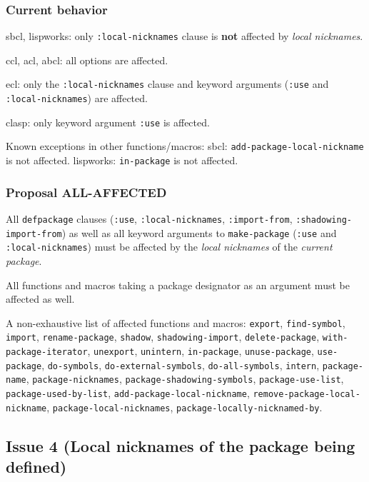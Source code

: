 \documentclass[11pt]{article}
\begin{document}
\subsubsection{Current behavior}
\label{sec:org2baa90e}
sbcl, lispworks:
  only \texttt{:local-nicknames} clause is \textbf{not} affected by \emph{local nicknames}.

ccl, acl, abcl:
  all options are affected.

ecl:
  only the \texttt{:local-nicknames} clause and keyword arguments (\texttt{:use} and
  \texttt{:local-nicknames}) are affected.

clasp:
  only keyword argument \texttt{:use} is affected.

Known exceptions in other functions/macros:
sbcl: \texttt{add-package-local-nickname} is not affected.
lispworks: \texttt{in-package} is not affected.
\subsubsection{Proposal ALL-AFFECTED}
\label{sec:orgcf9a10d}
All \texttt{defpackage} clauses (\texttt{:use}, \texttt{:local-nicknames}, \texttt{:import-from},
\texttt{:shadowing-import-from}) as well as all keyword arguments to \texttt{make-package}
(\texttt{:use} and \texttt{:local-nicknames}) must be affected by the \emph{local nicknames} of the
\emph{current package}.

All functions and macros taking a package designator as an argument must be
affected as well.

A non-exhaustive list of affected functions and macros:
  \texttt{export}, \texttt{find-symbol}, \texttt{import}, \texttt{rename-package}, \texttt{shadow},
  \texttt{shadowing-import}, \texttt{delete-package}, \texttt{with-package-iterator}, \texttt{unexport},
  \texttt{unintern}, \texttt{in-package}, \texttt{unuse-package}, \texttt{use-package}, \texttt{do-symbols},
  \texttt{do-external-symbols}, \texttt{do-all-symbols}, \texttt{intern}, \texttt{package-name},
  \texttt{package-nicknames}, \texttt{package-shadowing-symbols}, \texttt{package-use-list},
  \texttt{package-used-by-list}, \texttt{add-package-local-nickname},
  \texttt{remove-package-local-nickname}, \texttt{package-local-nicknames},
  \texttt{package-locally-nicknamed-by}.

\subsection{Issue 4 (Local nicknames of the package being defined)}
\label{sec:org6067ecf}
\end{document}
